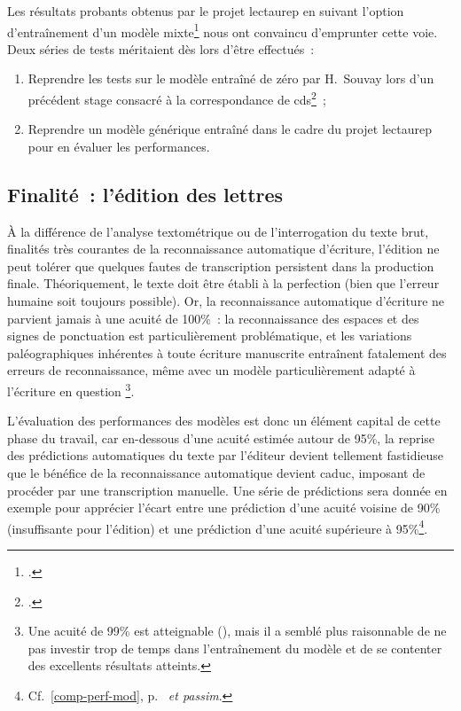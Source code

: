 \documentclass[a4paper,12pt,twoside]{book}
\begin{document}
				Les résultats probants obtenus par le projet \gls{lectaurep} en suivant l'option d'entraînement d'un modèle mixte\footcite{chagueCreationModelesTranscriptiona} nous ont convaincu d'emprunter cette voie. Deux séries de tests méritaient dès lors d'être effectués~:
		
				\begin{enumerate}
					\item Reprendre les tests sur le modèle entraîné de zéro par H.~Souvay lors d'un précédent stage consacré à la correspondance de \gls{cds}\footcite{souvayCorrespondanceConstanceSalm2021}~;
					\item Reprendre un modèle générique entraîné dans le cadre du projet \gls{lectaurep} pour en évaluer les performances.
				\end{enumerate}
		
			\subsection{Finalité~: l'édition des lettres}
				À la différence de l'analyse textométrique ou de l'interrogation du texte brut, finalités très courantes de la reconnaissance automatique d'écriture, l'édition ne peut tolérer que quelques fautes de transcription persistent dans la production finale. Théoriquement, le texte doit être établi à la perfection (bien que l'erreur humaine soit toujours possible). Or, la reconnaissance automatique d'écriture ne parvient jamais à une acuité de 100\%~: la reconnaissance des espaces et des signes de ponctuation est particulièrement problématique, et les variations paléographiques inhérentes à toute écriture manuscrite entraînent fatalement des erreurs de reconnaissance, même avec un modèle particulièrement adapté à l'écriture en question
				\footnote{Une acuité de 99\% est atteignable (\cite{stokesEScriptoriumVREManuscript2021}), mais il a semblé plus raisonnable de ne pas investir trop de temps dans l'entraînement du modèle et de se contenter des excellents résultats atteints.}.
				
				L'évaluation des performances des modèles est donc un élément capital de cette phase du travail, car en-dessous d'une acuité estimée autour de 95\%, la reprise des \glspl{prédiction} automatiques du texte par l'éditeur devient tellement fastidieuse que le bénéfice de la reconnaissance automatique devient caduc, imposant de procéder par une transcription manuelle. Une série de \glspl{prédiction} sera donnée en exemple pour apprécier l'écart entre une \gls{prédiction} d'une acuité voisine de 90\% (insuffisante pour l'édition) et une \gls{prédiction} d'une acuité supérieure à 95\%\footnote{Cf.~\ref{comp-perf-mod}, p.~\pageref{comp-perf-mod} \textit{et passim}.}.
				
\end{document}
